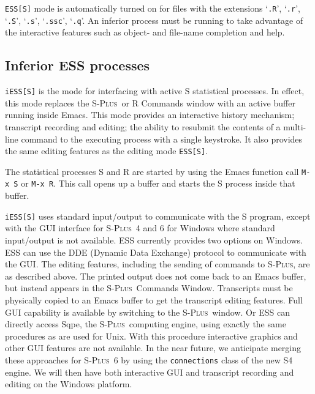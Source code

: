 \documentclass{article}
\newcommand*{\Splus}{\textsc{S-Plus}}
\newcommand{\stexttt}[1]{{\small\texttt{#1}}}
\newcommand{\file}[1]{`\stexttt{#1}'}
\begin{document}
\stexttt{ESS[S]} mode is automatically turned on for files with the
extensions \file{.R}, \file{.r}, \file{.S}, \file{.s}, \file{.ssc},
\file{.q}.  An inferior process must be running to take advantage of
the interactive features such as object- and file-name completion and
help.

\subsection{Inferior ESS processes}
\label{sec:S:inf}

\stexttt{iESS[S]} is the mode for interfacing with active S
statistical processes.  In effect, this mode replaces the \Splus\ or R
Commands window with an active buffer running inside Emacs.  This mode
provides an interactive history mechanism; transcript recording and
editing; the ability to resubmit the contents of a multi-line command
to the executing process with a single keystroke.  It also provides
the same editing features as the editing mode \stexttt{ESS[S]}.

The statistical processes S and R are started by using the Emacs
function call \stexttt{M-x~S} or \stexttt{M-x~R}.  This call opens up
a buffer and starts the S process inside that buffer.

\stexttt{iESS[S]} uses standard input/output to communicate with the S
program, except with the GUI interface for \Splus\ 4 and 6 for Windows
where standard input/output is not available.  ESS currently provides
two options on Windows.  ESS can use the DDE (Dynamic Data Exchange)
protocol to communicate with the GUI.  The editing features, including
the sending of commands to \Splus, are as described above.  The
printed output does not come back to an Emacs buffer, but instead
appears in the \Splus\ Commands Window.  Transcripts must be
physically copied to an Emacs buffer to get the transcript editing
features.  Full GUI capability is available by switching to the
\Splus\ window.  Or ESS can directly access Sqpe, the \Splus\ 
computing engine, using exactly the same procedures as are used for
Unix.  With this procedure interactive graphics and other GUI features
are not available.  In the near future, we anticipate merging these
approaches for \Splus\ 6 by using the \stexttt{connections} class of
the new S4 engine.  We will then have both interactive GUI and
transcript recording and editing on the Windows platform.
\end{document}
